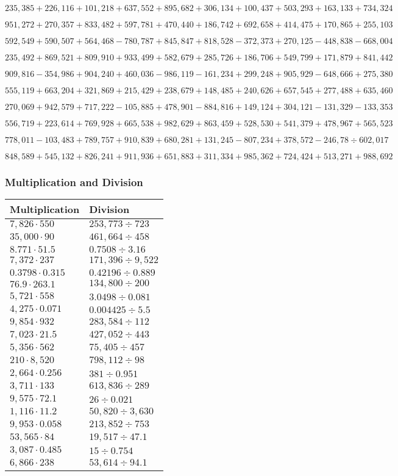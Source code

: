 \(235,385+226,116+101,218+637,552+895,682+306,134+100,437+503,293+163,133+ 734,324\)

\(951,272+270,357+833,482+597,781+470,440+186,742+692,658+414,475+170,865+255,103\)

\(592,549+590,507+564,468-780,787+845,847+818,528-372,373+270,125-448,838-668,004\)

\(235,492+869,521+809,910+933,499+582,679+285,726+186,706+549,799+171,879+841,442\)

\(909,816-354,986+904,240+460,036-986,119-161,234+299,248+905,929-648,666+275,380\)

\(555,119+663,204+321,869+215,429+238,679+148,485+240,626+657,545+277,488+635,460\)

\(270,069+942,579+717,222-105,885+478,901-884,816+149,124+304,121-131,329-133,353\)

\(556,719+223,614+769,928+665,538+982,629+863,459+528,530+541,379+478,967+565,523\)

\(778,011-103,483+789,757+910,839+680,281+131,245-807,234+378,572-246,78÷602,017\)

\(848,589+545,132+826,241+911,936+651,883+311,334+985,362+724,424+513,271+988,692\)

\hypertarget{multiplication-and-division-312}{%
\subsubsection{Multiplication and
Division}\label{multiplication-and-division-312}}

\begin{longtable}[]{@{}ll@{}}
\toprule
Multiplication & Division\tabularnewline
\midrule
\endhead
\(7,826\cdot550\) & \(253,773÷723\)\tabularnewline
\(35,000\cdot90\) & \(461,664÷458\)\tabularnewline
\(8.771\cdot51.5\) & \(0.7508÷3.16\)\tabularnewline
\(7,372\cdot237\) & \(171,396÷9,522\)\tabularnewline
\(0.3798\cdot0.315\) & \(0.42196÷0.889\)\tabularnewline
\(76.9\cdot263.1\) & \(134,800÷200\)\tabularnewline
\(5,721\cdot558\) & \(3.0498÷0.081\)\tabularnewline
\(4,275\cdot0.071\) & \(0.004425÷5.5\)\tabularnewline
\(9,854\cdot932\) & \(283,584÷112\)\tabularnewline
\(7,023\cdot21.5\) & \(427,052÷443\)\tabularnewline
\(5,356\cdot562\) & \(75,405÷457\)\tabularnewline
\(210\cdot8,520\) & \(798,112÷98\)\tabularnewline
\(2,664\cdot0.256\) & \(381÷0.951\)\tabularnewline
\(3,711\cdot133\) & \(613,836÷289\)\tabularnewline
\(9,575\cdot72.1\) & \(26÷0.021\)\tabularnewline
\(1,116\cdot11.2\) & \(50,820÷3,630\)\tabularnewline
\(9,953\cdot0.058\) & \(213,852÷753\)\tabularnewline
\(53,565\cdot84\) & \(19,517÷47.1\)\tabularnewline
\(3,087\cdot0.485\) & \(15÷0.754\)\tabularnewline
\(6,866\cdot238\) & \(53,614÷94.1\)\tabularnewline
\bottomrule
\end{longtable}

